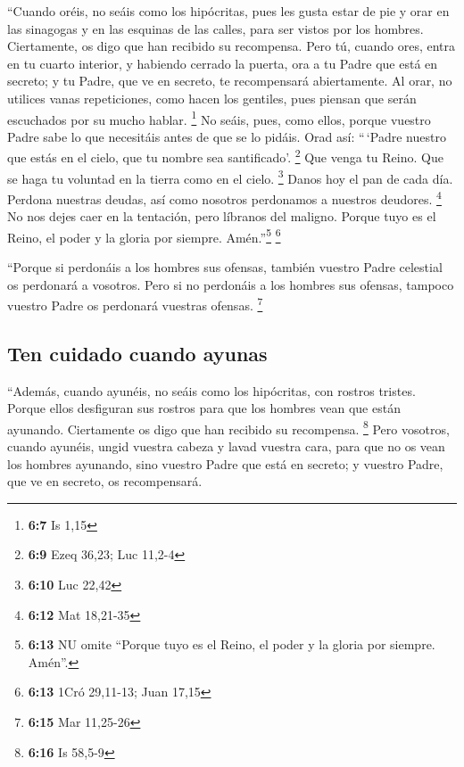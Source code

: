\begin{paracol}{2}
 ``Cuando oréis, no seáis como los hipócritas, pues les
gusta estar de pie y orar en las sinagogas y en las esquinas de las
calles, para ser vistos por los hombres. Ciertamente, os digo que han
recibido su recompensa.  Pero tú, cuando ores, entra en tu
cuarto interior, y habiendo cerrado la puerta, ora a tu Padre que está
en secreto; y tu Padre, que ve en secreto, te recompensará abiertamente.
 Al orar, no utilices vanas repeticiones, como hacen los
gentiles, pues piensan que serán escuchados por su mucho hablar.
\footnote{\textbf{6:7} Is 1,15}  No seáis, pues, como
ellos, porque vuestro Padre sabe lo que necesitáis antes de que se lo
pidáis.  Orad así: ``\,`Padre nuestro que estás en el
cielo, que tu nombre sea santificado'. \footnote{\textbf{6:9} Ezeq
  36,23; Luc 11,2-4}  Que venga tu Reino. Que se haga tu
voluntad en la tierra como en el cielo. \footnote{\textbf{6:10} Luc
  22,42}  Danos hoy el pan de cada día. 
Perdona nuestras deudas, así como nosotros perdonamos a nuestros
deudores. \footnote{\textbf{6:12} Mat 18,21-35}  No nos
dejes caer en la tentación, pero líbranos del maligno. Porque tuyo es el
Reino, el poder y la gloria por siempre. Amén.''\footnote{\textbf{6:13}
  NU omite ``Porque tuyo es el Reino, el poder y la gloria por siempre.
  Amén''.} \footnote{\textbf{6:13} 1Cró 29,11-13; Juan 17,15}

 ``Porque si perdonáis a los hombres sus ofensas, también
vuestro Padre celestial os perdonará a vosotros.  Pero si
no perdonáis a los hombres sus ofensas, tampoco vuestro Padre os
perdonará vuestras ofensas. \footnote{\textbf{6:15} Mar 11,25-26}

\hypertarget{ten-cuidado-cuando-ayunas}{%
\subsection{Ten cuidado cuando ayunas}\label{ten-cuidado-cuando-ayunas}}

 ``Además, cuando ayunéis, no seáis como los hipócritas,
con rostros tristes. Porque ellos desfiguran sus rostros para que los
hombres vean que están ayunando. Ciertamente os digo que han recibido su
recompensa. \footnote{\textbf{6:16} Is 58,5-9}  Pero
vosotros, cuando ayunéis, ungid vuestra cabeza y lavad vuestra cara,
 para que no os vean los hombres ayunando, sino vuestro
Padre que está en secreto; y vuestro Padre, que ve en secreto, os
recompensará.


\end{paracol}
